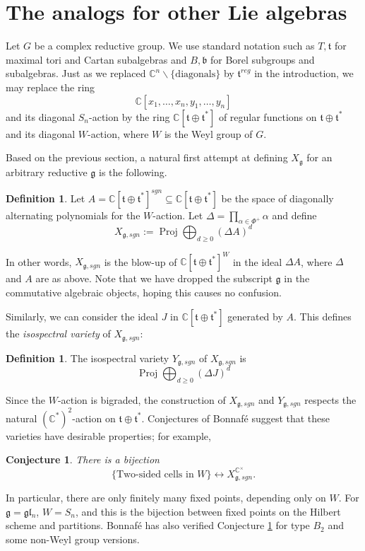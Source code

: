 \documentclass{amsart}
\numberwithin{equation}{section}
\newtheorem{conjecture}[lemma]{Conjecture}%
\theoremstyle{definition}
\newtheorem{definition}[lemma]{Definition}%
\DeclareMathOperator{\Proj}{\mathrm{Proj}}
\newcommand{\fb}{\mathfrak{b}}
\newcommand{\fl}{\mathfrak{l}}
\newcommand{\fg}{\mathfrak{g}}
\newcommand{\ft}{\mathfrak{t}}
\newcommand{\C}{{\mathbb C}}
\begin{document}
\section{The analogs for other Lie algebras}
\label{sec:definitions}
Let $G$ be a complex reductive group. We use standard notation such as $T, \ft$ for maximal tori and Cartan subalgebras and $B, \fb$ for Borel subgroups and subalgebras. Just as we replaced $\C^n\backslash\{\text{diagonals}\}$ by $\ft^{reg}$ in the introduction, we may replace the ring $$\C[x_1,\ldots,x_n,y_1,\ldots,y_n]$$ and its diagonal $S_n$-action by the ring $\C[\ft\oplus \ft^*]$ of regular functions on $\ft\oplus \ft^*$ and its diagonal $W$-action, where $W$ is the Weyl group of $G$.  

Based on the previous section, a natural first attempt at defining $X_\fg$ for an arbitrary reductive $\fg$ is the following.
\begin{definition}
Let $A=\C[\ft\oplus \ft^*]^{sgn}\subseteq \C[\ft\oplus\ft^*]$ be the space of diagonally alternating polynomials for the $W$-action.  Let $\Delta=\prod_{\alpha\in \Phi^+} \alpha$ and define
 $$X_{\fg,sgn}:=\Proj\bigoplus_{d\geq 0} (\Delta A)^d$$
\end{definition}
In other words, $X_{\fg,sgn}$ is the blow-up of $\C[\ft\oplus \ft^*]^W$ in the ideal $\Delta A$, where $\Delta$ and $A$ are as above. Note that we have dropped the subscript $\fg$ in the commutative algebraic objects, hoping this causes no confusion.

Similarly, we can consider the ideal $J$ in $\C[\ft\oplus \ft^*]$ generated by $A$. This defines the {\em isospectral variety} of $X_{\fg,sgn}$:
\begin{definition}
    The isospectral variety $Y_{\fg,sgn}$ of $X_{\fg,sgn}$ is $$\Proj\bigoplus_{d\geq 0} (\Delta J)^d$$
\end{definition}
Since the $W$-action is bigraded, the construction of $X_{\fg,sgn}$ and $Y_{\fg,sgn}$ respects the natural $(\C^*)^2$-action on $\ft\oplus \ft^*$. Conjectures of Bonnaf\'e suggest that these varieties have desirable properties; for example, 
\begin{conjecture}
\label{conj:bonnafe}
    There is a bijection 
    $$\{\text{Two-sided cells in } W\}\leftrightarrow X_{\fg,sgn}^{\C^\times}.$$
\end{conjecture}
In particular, there are only finitely many fixed points, depending only on $W$.
For $\fg=\fg\fl_n$, $W=S_n$, and this is the bijection between fixed points on the Hilbert scheme and partitions. Bonnaf\'e has also verified Conjecture \ref{conj:bonnafe} for type $B_2$ and some non-Weyl group versions. 
\end{document}
